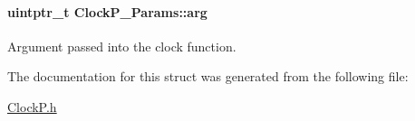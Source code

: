 \paragraph[{arg}]{\setlength{\rightskip}{0pt plus 5cm}uintptr\+\_\+t Clock\+P\+\_\+\+Params\+::arg}\label{struct_clock_p___params_a262d7e91bc0a7f98b23033084e68531c}
Argument passed into the clock function. 

The documentation for this struct was generated from the following file\+:\begin{DoxyCompactItemize}
\item 
\hyperlink{_clock_p_8h}{Clock\+P.\+h}\end{DoxyCompactItemize}
